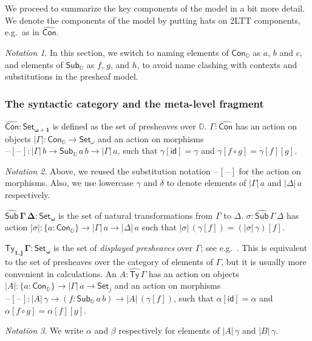 \documentclass[acmsmall,anonymous,review]{acmart}
\newcommand{\msf}[1]{\mathsf{#1}}
\newcommand{\mbb}[1]{\mathbb{#1}}
\newcommand{\bs}[1]{\boldsymbol{#1}}
\newcommand{\wh}[1]{\widehat{#1}}
\newcommand{\mbbo}{\mbb{O}}
\newcommand{\Con}{\msf{Con}}
\newcommand{\Cono}{\msf{Con}_{\mbbo}}
\newcommand{\Subo}{\msf{Sub}_{\mbbo}}
\newcommand{\hCon}{\wh{\msf{Con}}}
\newcommand{\hSub}{\wh{\msf{Sub}}}
\newcommand{\hTy}{\wh{\msf{Ty}}}
\newcommand{\id}{\msf{id}}
\newcommand{\Set}{\mathsf{Set}}
\newcommand{\blank}{{\mathord{\hspace{1pt}\text{--}\hspace{1pt}}}}
\theoremstyle{remark}
\newtheorem{notation}{Notation}
\begin{document}
We proceed to summarize the key components of the model in a bit more detail. We
denote the components of the model by putting hats on 2LTT components, e.g.\ as
in $\hCon$.

\begin{notation}
In this section, we switch to naming elements of $\Cono$ as $a$, $b$ and $c$,
and elements of $\Subo$ as $f$, $g$, and $h$, to avoid name clashing with
contexts and substitutions in the presheaf model.
\end{notation}

\subsubsection{The syntactic category and the meta-level fragment}

\begin{definition} $\bs{\wh{\Con} : \Set_{\omega+1}}$ is defined as the set of presheaves
over $\mbbo$. $\Gamma : \wh{\Con}$ has an action on objects $|\Gamma| :
\Cono \to \Set_\omega$ and an action on morphisms $\blank[\blank] : |\Gamma|\,b
\to \Subo\,a\,b \to |\Gamma|\,a$, such that $\gamma[\id] = \gamma$ and
$\gamma[f\circ g] = \gamma[f][g]$.

\begin{notation}
Above, we reused the substitution notation $\blank[\blank]$ for the action on
morphisms.  Also, we use lowercase $\gamma$ and $\delta$ to denote elements of
$|\Gamma|\,a$ and $|\Delta|\,a$ respectively.
\end{notation}

\end{definition}
\begin{definition} $\bs{\hSub\,\Gamma\,\Delta : \Set_\omega}$ is the set of natural transformations
from $\Gamma$ to $\Delta$. $\sigma : \hSub\,\Gamma\,\Delta$ has action
$|\sigma| : \{a : \Cono\} \to |\Gamma|\,a \to |\Delta|\,a$ such that
$|\sigma|\,(\gamma[f]) = (|\sigma|\,\gamma)[f]$.
\end{definition}

\begin{definition}
$\bs{\hTy_{1,j}\,\Gamma : \Set_\omega}$ is the set of \emph{displayed
presheaves} over $\Gamma$; see e.g.\ \cite[Chapter~1.2]{huber-thesis}. This is
equivalent to the set of presheaves over the category of elements of $\Gamma$,
but it is usually more convenient in calculations. An $A : \hTy\,\Gamma$ has
an action on objects $|A| : \{a : \Cono\} \to |\Gamma|\,a \to \Set_j$ and an
action on morphisms $\blank[\blank] : |A|\,\gamma \to (f : \Subo\,a\,b) \to
|A|\,(\gamma[f])$, such that $\alpha[\id] = \alpha$ and $\alpha[f \circ g] =
\alpha[f][g]$.

\begin{notation}
  We write $\alpha$ and $\beta$ respectively for elements of $|A|\,\gamma$ and
  $|B|\,\gamma$.
\end{notation}
\end{definition}
\end{document}
